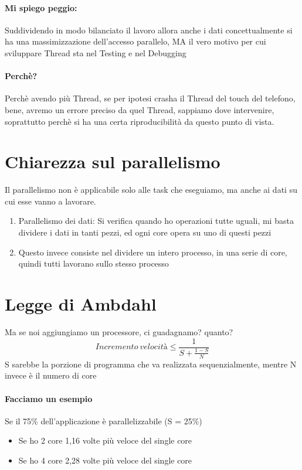 \documentclass[12pt, a4paper, openany, twoside]{book}
\begin{document}
\paragraph{Mi spiego peggio: }Suddividendo in modo bilanciato il lavoro allora 
anche i dati concettualmente si ha una massimizzazione dell'accesso parallelo,
MA il vero motivo per cui sviluppare Thread sta nel Testing e nel Debugging
\paragraph{Perchè? }Perchè avendo più Thread, se per ipotesi crasha il Thread
del touch del telefono, bene, avremo un errore preciso da quel Thread, sappiamo
dove intervenire, soprattutto perchè si ha una certa riproducibilità da questo
punto di vista.
\section{Chiarezza sul parallelismo}
Il parallelismo non è applicabile solo alle task che eseguiamo, ma anche ai dati
su cui esse vanno a lavorare.
\begin{enumerate}
	\item Parallelismo dei dati: Si verifica quando ho operazioni tutte uguali,
	mi basta dividere i dati in tanti pezzi, ed ogni core opera su uno di questi
	pezzi
	\item Questo invece consiste nel dividere un intero processo, in una serie
	di core, quindi tutti lavorano sullo stesso processo
\end{enumerate}
\section{Legge di Ambdahl}
Ma se noi aggiungiamo un processore, ci guadagnamo? quanto?
\[
Incremento~velocità\leq \frac{1}{S+\frac{1-S}{N}}
\]
S sarebbe la porzione di programma che va realizzata sequenzialmente, mentre
N invece è il numero di core
\paragraph{Facciamo un esempio} Se il 75\% dell'applicazione è parallelizzabile
(S = 25\%)
\begin{itemize}
	\item Se ho 2 core 1,16 volte più veloce del single core
	\item Se ho 4 core 2,28 volte più veloce del single core
\end{itemize}
\end{document}
